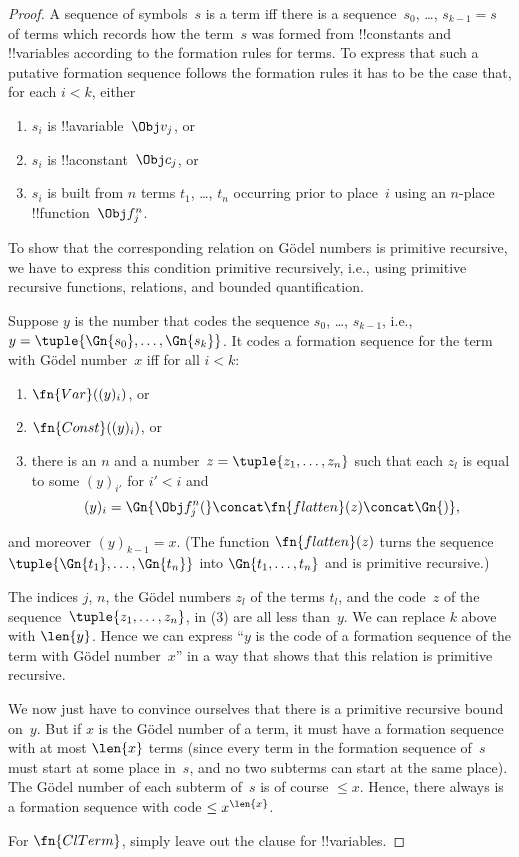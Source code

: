 \documentclass[../../../include/open-logic-section]{subfiles}
\begin{document}
\begin{proof}
A sequence of symbols~$s$ is a term iff there is a sequence~$s_0$,
\dots, $s_{k-1} = s$ of terms which records how the term~$s$ was formed
from !!{constant}s and !!{variable}s according to the formation rules
for terms. To express that such a putative formation sequence follows
the formation rules it has to be the case that, for each $i < k$, either
\begin{enumerate}
\item $s_i$ is !!a{variable}~$\Obj v_j$, or
\item $s_i$ is !!a{constant}~$\Obj c_j$, or
\item $s_i$ is built from $n$ terms $t_1$, \dots, $t_n$ occurring
  prior to place~$i$ using an $n$-place !!{function}~$\Obj f^n_j$.
\end{enumerate}
To show that the corresponding relation on G\"odel numbers is
primitive recursive, we have to express this condition primitive
recursively, i.e., using primitive recursive functions, relations, and
bounded quantification.

Suppose $y$ is the number that codes the sequence $s_0$, \dots, $s_{k-1}$,
i.e., $y = \tuple{\Gn{s_0}, \dots, \Gn{s_k}}$.  It codes a formation
sequence for the term with G\"odel number~$x$ iff for all $i < k$:
\begin{enumerate}
\item $\fn{Var}((y)_i)$, or
\item $\fn{Const}((y)_i)$, or
\item there is an $n$ and a number~$z = \tuple{z_1, \dots, z_n}$ such
  that each $z_l$ is equal to some $(y)_{i'}$ for $i' < i$ and
\[
(y)_i = \Gn{\Obj f^n_j(} \concat \fn{flatten}(z) \concat \Gn{)},
\]
\end{enumerate}
and moreover $(y)_{k-1} = x$.  (The function $\fn{flatten}(z)$ turns
the sequence $\tuple{\Gn{t_1}, \dots, \Gn{t_n}}$ into $\Gn{t_1, \dots,
  t_n}$ and is primitive recursive.)

The indices $j$, $n$, the G\"odel numbers $z_l$ of the terms $t_l$,
and the code~$z$ of the sequence~$\tuple{z_1, \dots, z_n}$, in (3) are
all less than~$y$.  We can replace $k$ above with $\len{y}$.  Hence we
can express ``$y$ is the code of a formation sequence of the term with
G\"odel number~$x$'' in a way that shows that this relation is
primitive recursive.

We now just have to convince ourselves that there is a primitive
recursive bound on~$y$.  But if $x$ is the G\"odel number of a term,
it must have a formation sequence with at most $\len{x}$ terms (since
every term in the formation sequence of~$s$ must start at some place
in~$s$, and no two subterms can start at the same place).  The G\"odel
number of each subterm of~$s$ is of course $\le x$.  Hence, there
always is a formation sequence with code $\le x^{\len{x}}$.

For $\fn{ClTerm}$, simply leave out the clause for !!{variable}s.
\end{proof}
\end{document}
